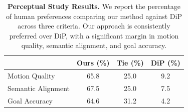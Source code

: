 \begin{table}[t]
  \footnotesize
  \centering
  \caption{
  \textbf{Perceptual Study Results.} We report the percentage of human preferences comparing our method against DiP across three criteria. Our approach is consistently preferred over DiP, with a significant margin in motion quality, semantic alignment, and goal accuracy.
  }
  \label{tab:perceptual_study}
  \begin{tabular}{lccc}
    \toprule
    & \textbf{Ours (\%)} & \textbf{Tie (\%)} & \textbf{DiP \cite{tevet2025closd} (\%)} \\
    \midrule
    Motion Quality      & 65.8 & 25.0 & 9.2 \\
    Semantic Alignment  & 67.5 & 25.0 & 7.5 \\
    Goal Accuracy       & 64.6 & 31.2 & 4.2 \\
    \bottomrule
  \end{tabular}
\end{table}
